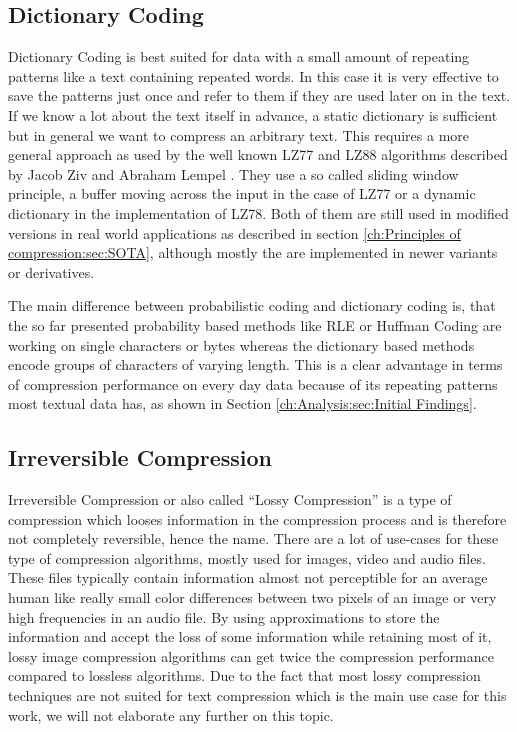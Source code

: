 \subsection{Dictionary Coding}
\par{
Dictionary Coding is best suited for data with a small amount of repeating patterns like a text containing repeated words. In this case it is very effective to save the patterns just once and refer to them if they are used later on in the text. If we know a lot about the text itself in advance, a static dictionary is sufficient but in general we want to compress an arbitrary text. This requires a more general approach as used by the well known LZ77 and LZ88 algorithms described by Jacob Ziv and Abraham Lempel \cite{lz}. They use a so called sliding window principle, a buffer moving across the input in the case of LZ77 or a dynamic dictionary in the implementation of LZ78. Both of them are still used in modified versions in real world applications as described in section \ref{ch:Principles of compression:sec:SOTA}, although mostly the are implemented in newer variants or derivatives.
}
\par{
The main difference between probabilistic coding and dictionary coding is, that the so far presented probability based methods like RLE or Huffman Coding are working on single characters or bytes whereas the dictionary based methods encode groups of characters of varying length. This is a clear advantage in terms of compression performance on every day data because of its repeating patterns most textual data has, as shown in Section \ref{ch:Analysis:sec:Initial Findings}.
}


\subsection{Irreversible Compression}
\par{
Irreversible Compression or also called \enquote{Lossy Compression} is a type of compression which looses information in the compression process and is therefore not completely reversible, hence the name. There are a lot of use-cases for these type of compression algorithms, mostly used for images, video and audio files. These files typically contain information almost not perceptible for an average human like really small color differences between two pixels of an image or very high frequencies in an audio file. By using approximations to store the information and accept the loss of some information while retaining most of it, lossy image compression algorithms can get twice the compression performance compared to lossless algorithms. Due to the fact that most lossy compression techniques are not suited for text compression which is the main use case for this work, we will not elaborate any further on this topic.
}


